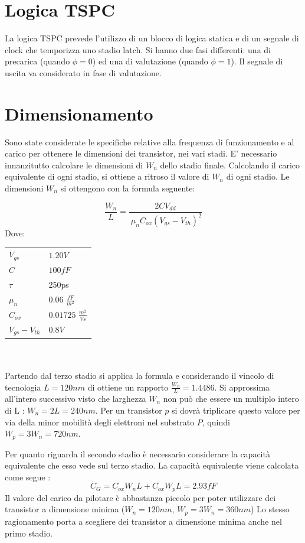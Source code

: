\documentclass[11pt]{article} %
\begin{document}
\section{Logica TSPC}
La logica TSPC prevede l'utilizzo di un blocco di logica statica e di un segnale di clock che temporizza uno stadio latch. Si hanno due fasi differenti: una di precarica (quando $\phi=0$) ed una di valutazione (quando $\phi=1$). Il segnale di uscita va considerato in fase di valutazione.

\section{Dimensionamento}
Sono state considerate le specifiche relative alla frequenza di funzionamento e al carico per ottenere le dimensioni dei transistor, nei vari stadi.  
E' necessario innanzitutto calcolare le dimensioni di $W_{n}$ dello stadio finale. Calcolando il carico equivalente di ogni stadio, si ottiene a ritroso il valore di $W_{n}$ di ogni stadio.
Le dimensioni $W_{n}$ si ottengono con la formula seguente:

\begin{equation} 
\frac{W_{n}}{L}=\frac{2CV_{dd}}{\
 \mu_{n}C_{ox}(V_{gs}-V_{th})^2}
\end{equation}
Dove:\mbox{}\\

\begin{tabular}{|ll|}
\hline
$V_{gs}$ & $1.20V$ \\
$C$ & $100fF$ \\
$\tau$ & 250ps\\
$\mu_{n}$ & $0.06$  $\frac{fF}{m^2}$  \\
$C_{ox}$ & $0.01725$ $\frac{m^2}{Vs}$  \\
$V_{gs} - V_{th}$ & $0.8V$ \\
\hline
\end{tabular}
\mbox{}\\
\\
Partendo dal terzo stadio si applica la formula e considerando il vincolo di tecnologia $L= 120 nm$ di ottiene un rapporto $\frac {W_{n}}{L}= 1.4486$.
Si approssima all'intero successivo visto che larghezza  $W_{n}$ non può che essere un multiplo intero di L :   $W_{n}=2L= 240nm$.
Per un transistor $p$ si dovrà triplicare questo valore per via della minor mobilità degli elettroni nel substrato $P$, quindi $W_{p}=3W_{n}= 720nm$.

Per quanto riguarda il secondo stadio è necessario considerare la capacità equivalente che esso vede sul terzo stadio.
La capacità equivalente viene calcolata come segue :
\begin{equation}
C_{G}= C_{ox}W_{n}L+C_{ox}W_{p}L= 2.93fF
\end{equation}
Il valore del carico da pilotare è abbastanza piccolo per poter utilizzare dei transistor a dimensione minima ($W_{n}=120 nm$, $W_{p}=3W_{n}= 360nm$)
Lo stesso ragionamento porta a scegliere dei transistor a dimensione minima anche nel primo stadio. 
\end{document}
